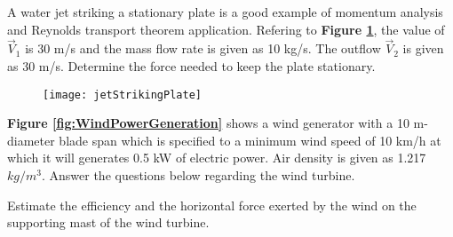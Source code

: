 

\clearpage

	\item A water jet striking a stationary plate is a good example of momentum analysis and Reynolds transport theorem application. Refering to \textbf{Figure \ref{fig:jetStrikingPlate}}, the value of $\overrightarrow{V}_{1}$ is 30 m/s and the mass flow rate is given as 10 kg/s. The outflow $\overrightarrow{V}_{2}$ is given as 30 m/s. Determine the force needed to keep the plate stationary. 		


		
		\listclose

		\begin{figure}[H] %
		\centering
		\texttt{[image: jetStrikingPlate]}
		\caption{\rajah}
		\label{fig:jetStrikingPlate}
	    \end{figure}	

	
	\clearpage 

	
	\item \textbf{Figure \ref{fig:WindPowerGeneration}} shows a wind generator with a 10 m-diameter blade span which is specified to a minimum wind speed of 10 km/h at which it will generates 0.5 kW of electric power. Air density is given as 1.217 $kg/m^{3}$. Answer the questions below regarding the wind turbine. 
	
	

\listbegin

	\item Estimate the efficiency and the horizontal force exerted by the wind on the supporting mast of the wind turbine.   
	
